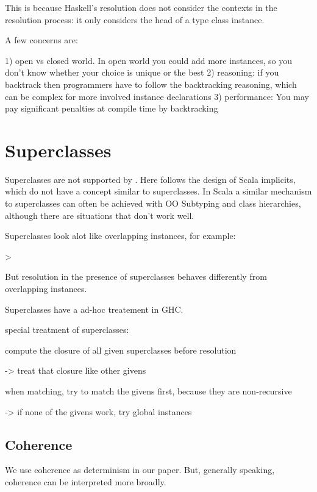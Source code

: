 This is because Haskell's resolution does not consider the contexts in the resolution process:
it only considers the head of a type class instance. 

A few concerns are:

1) open vs closed world. In open world you could add more instances, so you don't know whether your choice is unique or the best
2) reasoning: if you backtrack then programmers have to follow the backtracking reasoning, which can be complex for more involved instance declarations
3) performance: You may pay significant penalties at compile time by backtracking

\section{Superclasses}

Superclasses are not supported by \name. Here \name follows the design of Scala implicits, which 
do not have a concept similar to superclasses. In Scala a similar mechanism to 
superclasses can often be achieved with OO Subtyping and class hierarchies, although there are situations 
that don't work well.  

Superclasses look alot like overlapping instances, for example:

>

But resolution in the presence of superclasses behaves differently from overlapping instances. 

Superclasses have a ad-hoc treatement in GHC. 

special treatment of superclasses:

compute the closure of all given superclasses before resolution

-> treat that closure like other givens

 when matching, try to match the givens first, because they are non-recursive

-> if none of the givens work, try global instances


\subsection{Coherence}

We use coherence as determinism in our paper. But, generally speaking, coherence can be interpreted
more broadly. 


 